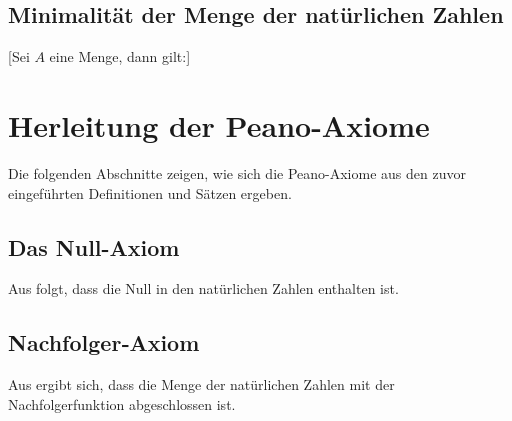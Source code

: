 \documentclass[main.tex]{subfiles}
\begin{document}
\begin{tabproof}
    {}
    {}
    {}
    {}
\end{tabproof}

\subsection{Minimalität der Menge der natürlichen Zahlen}

[Sei \(A\) eine Menge, dann gilt:]
\begin{tabproof}
\end{tabproof}

\section{Herleitung der Peano-Axiome}

Die folgenden Abschnitte zeigen, wie sich die Peano-Axiome aus den zuvor eingeführten Definitionen und Sätzen ergeben.

\subsection{Das Null-Axiom}

Aus  folgt, dass die Null in den natürlichen Zahlen enthalten ist.

\subsection{Nachfolger‑Axiom}

Aus  ergibt sich, dass die Menge der natürlichen Zahlen mit der Nachfolgerfunktion abgeschlossen ist.
\end{document}
